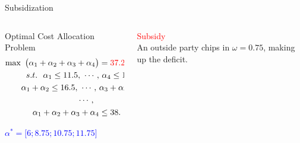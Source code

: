 \documentclass[14pt]{beamer}
\begin{document}
\begin{frame}{Subsidization }
\small
\vspace{-4mm}
\begin{columns}

\begin{column}{6.5cm}
\footnotesize
\vspace{-1em}
\begin{shaded}
\centering
Optimal Cost Allocation Problem
\begin{eqnarray*}
\begin{aligned}
\max ~\big(\alpha_1 + \alpha_2 + \alpha_3 + \alpha_4\big) &= \textcolor{red}{37.25 < 38}\\
s.t.~~ \alpha_1 \leq 11.5,~\cdots,&~\alpha_4 \leq 14.5,\\
\alpha_1 + \alpha_2 \leq 16.5,~\cdots,~ &\alpha_3+\alpha_4 \leq 22.5,\\
~~~~~~~~~~\cdots,~~&\\
\alpha_1 + \alpha_2 + \alpha_3 + \alpha_4 &\leq 38.
\end{aligned}
\end{eqnarray*}
\vspace{-0.5em}
\end{shaded}
\begin{shaded}
\centering
\textcolor{blue}{
$\alpha^* = \big[6;8.75;10.75;11.75\big]$}
\end{shaded}
\end{column}

\begin{column}{4.5cm}
\small
\centering

\textcolor{red}{Subsidy}\\
\vspace{2em}
An outside party chips in $\omega=0.75$, making up the deficit.

\end{column}

\end{columns}
\end{frame}
\end{document}
